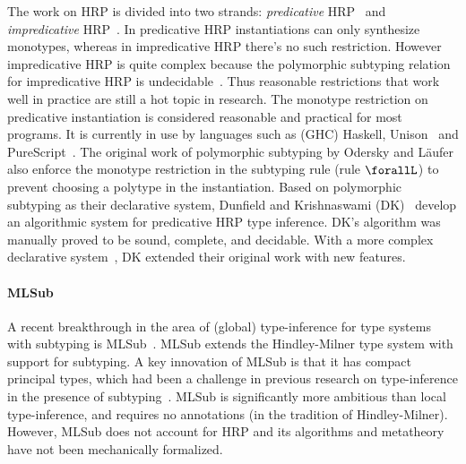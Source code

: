 The work on HRP is divided into two strands: \emph{predicative} HRP~\cite{dunfield2013complete,jones2007practical,odersky1996putting,dunfield2019sound}
and \emph{impredicative} HRP~\cite{le2003ml,leijen2008hmf,vytiniotis2008fph,Serrano2018}.
In predicative HRP instantiations can
only synthesize monotypes, whereas in impredicative HRP there's no
such restriction. However impredicative HRP is quite complex because
the polymorphic subtyping relation for impredicative HRP is undecidable~\cite{tiuryn1996subtyping}.
Thus reasonable restrictions that work well in practice are still
a hot topic in research.
The monotype restriction on predicative instantiation is considered reasonable
and practical for most programs. It is currently in use by languages such as
(GHC) Haskell, Unison~\cite{Unison} and PureScript~\cite{PureScript}.
The original work of polymorphic subtyping by Odersky and L\"aufer also enforce
the monotype restriction in the subtyping rule (rule $\forallL$) to prevent
choosing a polytype in the instantiation. Based on polymorphic subtyping as
their declarative system,
Dunfield and Krishnaswami (DK)~\cite{dunfield2013complete} develop an
algorithmic system for predicative HRP type inference. DK's algorithm was
manually proved to be sound, complete, and decidable.
With a more complex declarative system~\cite{dunfield2019sound}, DK
extended their original work with new features.

\paragraph{MLSub} A recent breakthrough in the area of (global) type-inference
for type systems with subtyping is MLSub~\cite{dolan17polymorphism}. MLSub extends the Hindley-Milner
type system with support for subtyping. A key innovation
of MLSub is that it has compact principal types, which had been a challenge
in previous research on type-inference in the presence of subtyping~\cite{eifrig95inference,Trifonov96subtyping,pottier1998inference}.
MLSub is significantly more ambitious than local type-inference, and requires
no annotations (in the tradition of Hindley-Milner). However, MLSub does not
account for HRP and its algorithms and metatheory have not been mechanically
formalized.

